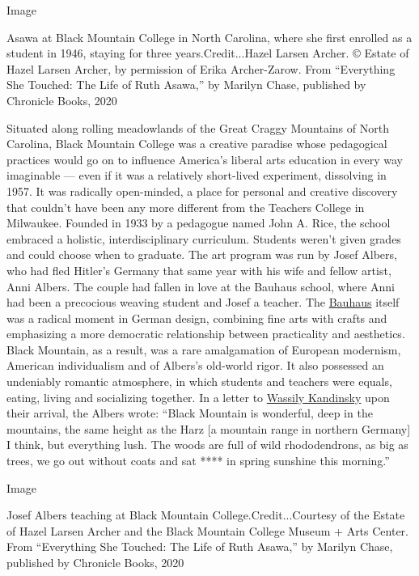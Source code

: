 Image

Asawa at Black Mountain College in North Carolina, where she first
enrolled as a student in 1946, staying for three years.Credit...Hazel
Larsen Archer. © Estate of Hazel Larsen Archer, by permission of Erika
Archer-Zarow. From ``Everything She Touched: The Life of Ruth Asawa,''
by Marilyn Chase, published by Chronicle Books, 2020

Situated along rolling meadowlands of the Great Craggy Mountains of
North Carolina, Black Mountain College was a creative paradise whose
pedagogical practices would go on to influence America's liberal arts
education in every way imaginable --- even if it was a relatively
short-lived experiment, dissolving in 1957. It was radically
open-minded, a place for personal and creative discovery that couldn't
have been any more different from the Teachers College in Milwaukee.
Founded in 1933 by a pedagogue named John A. Rice, the school embraced a
holistic, interdisciplinary curriculum. Students weren't given grades
and could choose when to graduate. The art program was run by Josef
Albers, who had fled Hitler's Germany that same year with his wife and
fellow artist, Anni Albers. The couple had fallen in love at the Bauhaus
school, where Anni had been a precocious weaving student and Josef a
teacher. The
\href{https://www.nytimes.com/2019/02/04/t-magazine/bauhaus-school-architecture-history.html}{Bauhaus}
itself was a radical moment in German design, combining fine arts with
crafts and emphasizing a more democratic relationship between
practicality and aesthetics. Black Mountain, as a result, was a rare
amalgamation of European modernism, American individualism and of
Albers's old-world rigor. It also possessed an undeniably romantic
atmosphere, in which students and teachers were equals, eating, living
and socializing together. In a letter to
\href{https://www.nytimes.com/2011/10/23/arts/artsspecial/kandinsky-painting-reveals-a-mystery-beneath.html}{Wassily
Kandinsky} upon their arrival, the Albers wrote: ``Black Mountain is
wonderful, deep in the mountains, the same height as the Harz {[}a
mountain range in northern Germany{]} I think, but everything lush. The
woods are full of wild rhododendrons, as big as trees, we go out without
coats and sat **** in spring sunshine this morning.''

Image

Josef Albers teaching at Black Mountain College.Credit...Courtesy of the
Estate of Hazel Larsen Archer and the Black Mountain College Museum +
Arts Center. From ``Everything She Touched: The Life of Ruth Asawa,'' by
Marilyn Chase, published by Chronicle Books, 2020

